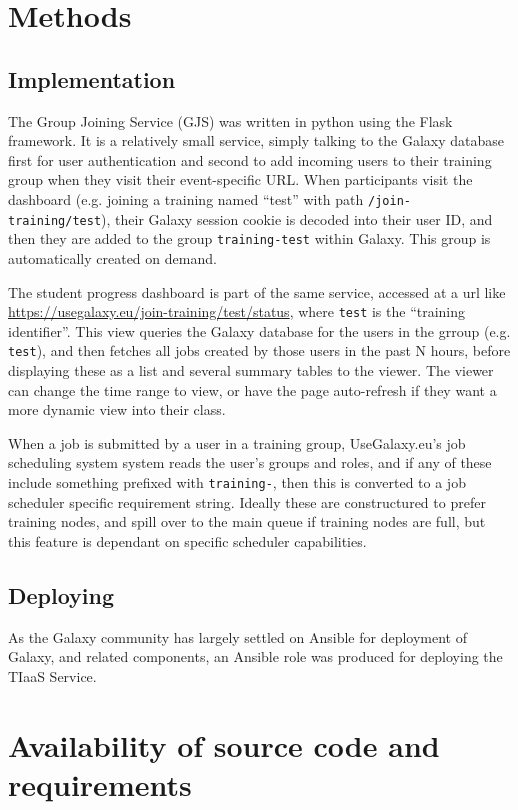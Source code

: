 \documentclass[a4paper,num-refs]{oup-contemporary}
\begin{document}
\section{Methods}

\subsection{Implementation}
The Group Joining Service (GJS) was written in python using the Flask framework. It is a relatively small service, simply talking to the Galaxy database first for user authentication and second to add incoming users to their training group when they visit their event-specific URL. When participants visit the dashboard (e.g. joining a training named ``test'' with path \texttt{/join-training/test}), their Galaxy session cookie is decoded into their user ID, and then they are added to the group \texttt{training-test} within Galaxy. This group is automatically created on demand.

The student progress dashboard is part of the same service, accessed at a url like \url{https://usegalaxy.eu/join-training/test/status}, where \texttt{test} is the ``training identifier''. This view queries the Galaxy database for the users in the grroup (e.g. \texttt{test}), and then fetches all jobs created by those users in the past N hours, before displaying these as a list and several summary tables to the viewer. The viewer can change the time range to view, or have the page auto-refresh if they want a more dynamic view into their class.

When a job is submitted by a user in a training group, UseGalaxy.eu's job scheduling system system reads the user's groups and roles, and if any of these include something prefixed with \texttt{training-}, then this is converted to a job scheduler specific requirement string. Ideally these are constructured to prefer training nodes, and spill over to the main queue if training nodes are full, but this feature is dependant on specific scheduler capabilities.

\subsection{Deploying}
As the Galaxy community has largely settled on Ansible for deployment of Galaxy, and related components, an Ansible role was produced for deploying the TIaaS Service.

\section{Availability of source code and requirements}
\end{document}
